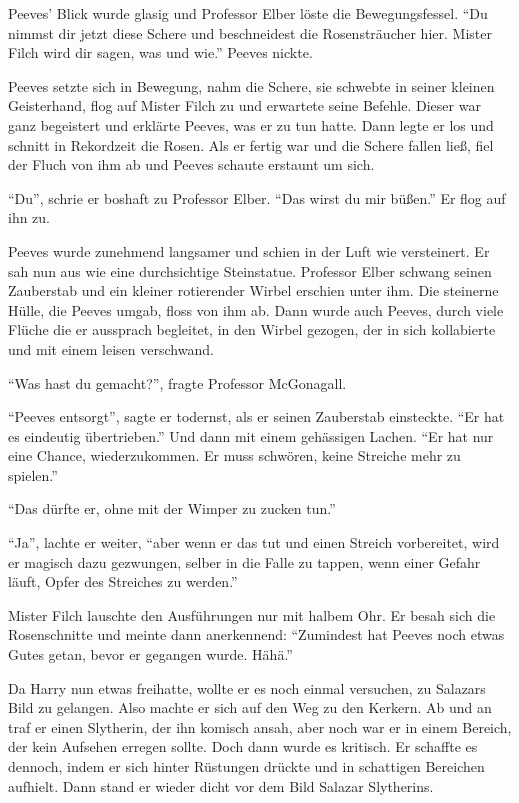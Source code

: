 Peeves' Blick wurde glasig und Professor Elber löste die Bewegungsfessel. \enquote{Du nimmst dir jetzt diese Schere und beschneidest die Rosensträucher hier. Mister Filch wird dir sagen, was und wie.} Peeves nickte. 

Peeves setzte sich in Bewegung, nahm die Schere, sie schwebte in seiner kleinen Geisterhand, flog auf Mister Filch zu und erwartete seine Befehle. Dieser war ganz begeistert und erklärte Peeves, was er zu tun hatte. Dann legte er los und schnitt in Rekordzeit die Rosen. Als er fertig war und die Schere fallen ließ, fiel der Fluch von ihm ab und Peeves schaute erstaunt um sich.

\enquote{Du}, schrie er boshaft zu Professor Elber. \enquote{Das wirst du mir büßen.} Er flog auf ihn zu.


Peeves wurde zunehmend langsamer und schien in der Luft wie versteinert. Er sah nun aus wie eine durchsichtige Steinstatue. Professor Elber schwang seinen Zauberstab und ein kleiner rotierender Wirbel erschien unter ihm. Die steinerne Hülle, die Peeves umgab, floss von ihm ab. Dann wurde auch Peeves, durch viele Flüche die er aussprach begleitet, in den Wirbel gezogen, der in sich kollabierte und mit einem leisen  verschwand.

\enquote{Was hast du gemacht?}, fragte Professor McGonagall.

\enquote{Peeves entsorgt}, sagte er todernst, als er seinen Zauberstab einsteckte. \enquote{Er hat es eindeutig übertrieben.} Und dann mit einem gehässigen Lachen. \enquote{Er hat nur eine Chance, wiederzukommen. Er muss schwören, keine Streiche mehr zu spielen.}

\enquote{Das dürfte er, ohne mit der Wimper zu zucken tun.}

\enquote{Ja}, lachte er weiter, \enquote{aber wenn er das tut und einen Streich vorbereitet, wird er magisch dazu gezwungen, selber in die Falle zu tappen, wenn einer Gefahr läuft, Opfer des Streiches zu werden.}

Mister Filch lauschte den Ausführungen nur mit halbem Ohr. Er besah sich die Rosenschnitte und meinte dann anerkennend: \enquote{Zumindest hat Peeves noch etwas Gutes getan, bevor er gegangen wurde. Hähä.}

Da Harry nun etwas freihatte, wollte er es noch einmal versuchen, zu Salazars Bild zu gelangen. Also machte er sich auf den Weg zu den Kerkern. Ab und an traf er einen Slytherin, der ihn komisch ansah, aber noch war er in einem Bereich, der kein Aufsehen erregen sollte. Doch dann wurde es kritisch. Er schaffte es dennoch, indem er sich hinter Rüstungen drückte und in schattigen Bereichen aufhielt. Dann stand er wieder dicht vor dem Bild Salazar Slytherins.

